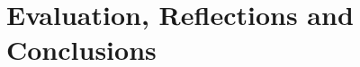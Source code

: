 
\chapter{Evaluation, Reflections and Conclusions}

\label{Eval} 

\lipsum[5]

\lipsum[6]

\lipsum[7]